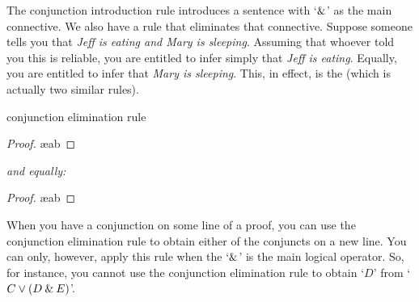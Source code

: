 The conjunction introduction rule introduces a sentence with `$\mathbin{\&}$' as the main connective. We also have a rule that eliminates that connective. Suppose someone tells you that \textit{Jeff is eating and Mary is sleeping}. Assuming that whoever told you this is reliable, you are entitled to infer simply that \textit{Jeff is eating}. Equally, you are entitled to infer that \textit{Mary is sleeping}. This, in effect, is the  (which is actually two similar rules).

\begin{factboxy}{conjunction elimination rule}
\begin{proof}
	 \ae{ab}
\end{proof}
\textit{and equally:}
\begin{proof}
	 \ae{ab}
\end{proof}
\end{factboxy}
\noindent When you have a conjunction on some line of a proof, you can use the conjunction elimination rule to obtain either of the conjuncts on a new line. You can only, however, apply this rule when the `$\mathbin{\&}$' is the main logical operator. So, for instance, you cannot use the conjunction elimination rule to obtain `$D$' from `$C \vee (D \mathbin{\&} E)$'.


